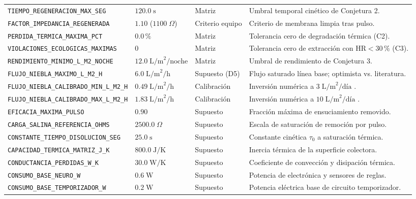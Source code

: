 {\begin{longtable}{@{}L{4.7cm}L{2.7cm}L{2.0cm}L{5.3cm}@{}}
\texttt{TIEMPO\_REGENERACION\_\allowbreak MAX\_SEG} & $120.0\;\text{s}$ & Matriz & Umbral temporal cin\'etico de Conjetura 2. \\
\texttt{FACTOR\_IMPEDANCIA\_\allowbreak REGENERADA} & $1.10$ ($1100\;\Omega$) & Criterio equipo & Criterio de membrana limpia tras pulso. \\
\texttt{PERDIDA\_TERMICA\_\allowbreak MAXIMA\_PCT} & $0.0\,\%$ & Matriz & Tolerancia cero de degradaci\'on t\'ermica (C2). \\
\texttt{VIOLACIONES\_ECOLOGICAS\_\allowbreak MAXIMAS} & $0$ & Matriz & Tolerancia cero de extracci\'on con $\text{HR}<30\,\%$ (C3). \\
\texttt{RENDIMIENTO\_MINIMO\_\allowbreak L\_M2\_NOCHE} & $12.0\;\text{L/m}^2\text{/noche}$ & Matriz & Umbral de rendimiento de Conjetura 3. \\
\texttt{FLUJO\_NIEBLA\_MAXIMO\_\allowbreak L\_M2\_H} & $6.0\;\text{L/m}^2\text{/h}$ & Supuesto (D5) & Flujo saturado l\'inea base; optimista vs. literatura. \\
\texttt{FLUJO\_NIEBLA\_CALIBRADO\_\allowbreak MIN\_L\_M2\_H} & $0.49\;\text{L/m}^2\text{/h}$ & Calibraci\'on & Inversi\'on num\'erica a $3\;\text{L/m}^2\text{/d\'ia}$ \parencite{klemm2012fog}. \\
\texttt{FLUJO\_NIEBLA\_CALIBRADO\_\allowbreak MAX\_L\_M2\_H} & $1.83\;\text{L/m}^2\text{/h}$ & Calibraci\'on & Inversi\'on num\'erica a $10\;\text{L/m}^2\text{/d\'ia}$ \parencite{klemm2012fog}. \\
\texttt{EFICACIA\_MAXIMA\_PULSO} & $0.90$ & Supuesto & Fracci\'on m\'axima de ensuciamiento removido. \\
\texttt{CARGA\_SALINA\_\allowbreak REFERENCIA\_OHMS} & $2500.0\;\Omega$ & Supuesto & Escala de saturaci\'on de remoci\'on por pulso. \\
\texttt{CONSTANTE\_TIEMPO\_\allowbreak DISOLUCION\_SEG}& $25.0\;\text{s}$ & Supuesto & Constante cin\'etica $\tau_0$ a saturaci\'on t\'ermica. \\
\texttt{CAPACIDAD\_TERMICA\_\allowbreak MATRIZ\_J\_K} & $800.0\;\text{J/K}$ & Supuesto & Inercia t\'ermica de la superficie colectora. \\
\texttt{CONDUCTANCIA\_\allowbreak PERDIDAS\_W\_K} & $30.0\;\text{W/K}$ & Supuesto & Coeficiente de convecci\'on y disipaci\'on t\'ermica. \\
\texttt{CONSUMO\_BASE\_NEURO\_W} & $0.6\;\text{W}$ & Supuesto & Potencia de electr\'onica y sensores de reglas. \\
\texttt{CONSUMO\_BASE\_\allowbreak TEMPORIZADOR\_W} & $0.2\;\text{W}$ & Supuesto & Potencia el\'ectrica base de circuito temporizador. \\

\end{longtable}}
